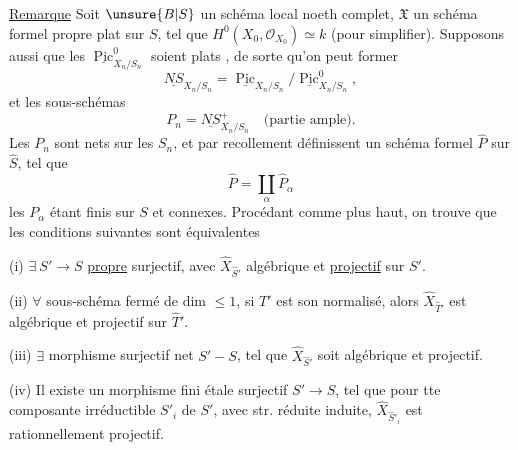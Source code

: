 
\uline{Remarque}  Soit $\unsure{B|S}$  un schéma local noeth complet, $\mathfrak X$ un schéma formel propre  plat sur $S$, tel que $H^0(X_0,\mathcal O_{X_0})\simeq k$ (pour simplifier). Supposons aussi  que  les $\underline{\operatorname{Pic}}^0_{X_n/S_n}$ soient plats  , de sorte qu'on peut former
\[
\underline{NS}_{X_n/S_n}=\underline{\operatorname{Pic}}_{X_n/S_n}/\underline{\operatorname{Pic}}^0_{X_n/S_n},
\]
et les sous-schémas
\[
P_n=\underline{NS}^{+}_{X_n/S_n}\quad\text{(partie ample).}
\]
Les $P_n$ sont nets sur les $S_n$, et par recollement définissent un schéma formel $\widehat P$ sur $\widehat S$, tel que
\[
\widehat P=\coprod_\alpha\widehat P_\alpha
\]
les $P_\alpha$ étant finis  sur $S$ et connexes. Procédant comme plus haut, on trouve que les conditions suivantes sont équivalentes

(i) $\exists\ S'\longrightarrow S$ \uline{propre} surjectif,  avec $\widehat X_{\widehat S'}$ algébrique et \uline{projectif} sur $S'$.

(ii) $\forall$ sous-schéma fermé  de dim $\leq1$, si $T'$ est son normalisé, alors $\widehat X_{\widehat T'}$ est algébrique et projectif sur $\widehat T'$.

(iii) $\exists$ morphisme  surjectif net $S'\mathbin{-}S$, tel que $\widehat X_{\widehat S'}$ soit algébrique et projectif.


(iv) Il existe un morphisme fini étale surjectif $S'\longrightarrow S$, tel que pour tte composante irréductible $S'_i$ de $S'$, avec str. réduite induite, $\widehat X_{\widehat S'_i}$ est rationnellement projectif.

